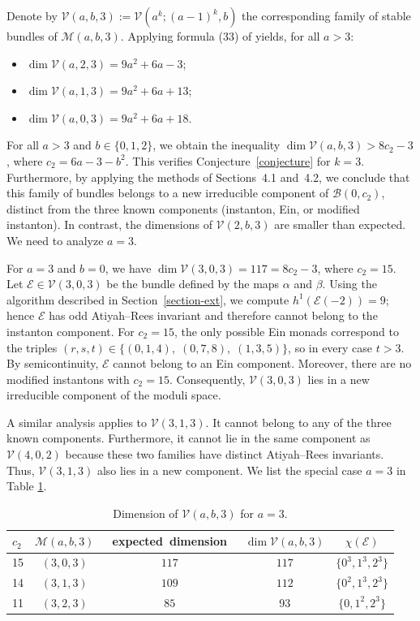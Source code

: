 \documentclass[twoside,reqno]{amsart}
\theoremstyle{plain}
\newcommand{\E}{\mathcal{E}}
\newcommand{\cM}{\mathcal{M}}
\begin{document}
Denote by $\mathcal{V}(a,b,3):=\mathcal{V}({a}^k;({a-1})^k,{b})$ the corresponding family of stable bundles of $\cM(a,b,3)$.
Applying formula (33) of \cite{MF2021} yields, for all $a>3$:
\begin{itemize}
     \item$\dim \mathcal{V}(a,2,3)=9a^{2}+6a-3$;
     \item$\dim \mathcal{V}(a,1,3)=9a^2+6a+13$; 
     \item$\dim \mathcal{V}(a,0,3)=9a^{2}+6a+18$.
\end{itemize}
 For all \(a>3\) and \(b\in\{0,1,2\}\), we obtain the inequality  $\dim\mathcal{V}(a,b,3) > 8c_2-3$,
where \(c_2 = 6a - 3 - b^2\). This verifies Conjecture~\ref{conjecture} for \(k=3\). Furthermore, by applying the 
methods of Sections~4.1 and~4.2, we conclude that this family of bundles belongs to a new irreducible 
component of \(\mathcal{B}(0,c_2)\), distinct from the three known components (instanton, Ein, or modified instanton). In contrast, the dimensions of $\mathcal{V}(2,b,3)$ are smaller than expected. We need to analyze $a=3$.
 
 For $a=3$ and $b=0$, we have $\dim\mathcal{V}(3,0,3)=117=8c_2-3$, where $c_2=15$.
Let $\E\in\mathcal{V}(3,0,3)$ be the bundle defined by the maps $\alpha$ and $\beta$.
Using the algorithm described in Section~\ref{section-ext}, we compute $h^{1}(\E(-2))=9$; hence $\E$ has odd Atiyah--Rees invariant and therefore cannot belong to the instanton component. For $c_2=15$, the only possible Ein monads correspond to the triples $(r,s,t)\in\{(0,1,4),\;(0,7,8),\;(1,3,5)\}$,
so in every case $t>3$. By semicontinuity, $\E$ cannot belong to an Ein component. Moreover, there are no modified instantons with $c_2=15$. Consequently, $\mathcal{V}(3,0,3)$ lies in a new irreducible component of the moduli space. 

A similar analysis applies to $\mathcal{V}(3,1,3)$. It cannot belong to any of the three known components. 
Furthermore, it cannot lie in the same component as $\mathcal{V}(4,0,2)$ because these two families have distinct Atiyah--Rees invariants. Thus, $\mathcal{V}(3,1,3)$ also lies in a new component.  We list the special case $a=3$ in Table \ref{table:2}.
    \begin{table}[h]
 \centering
\begin{tabular}{|l|c|c|c|c|}
\hline
$c_2$ & $\cM(a,b,3)$ &  \mbox{ expected dimension } & $\dim \mathcal{V}(a,b,3)$ & $\chi(\E)$\\ \hline
         15    & $(3,0,3)$     &  $117$    &      $117$&$\{0^3,1^3,2^3\}$  \\ \hline
    14   &$(3,1,3)$ &       $109$     &   $112$  &$\{0^2,1^3,2^3\}$\\ \hline
      11   & $(3,2,3)$    &   $85$         &      93   & $\{0,1^2,2^3\}$ \\ \hline
\end{tabular}
\caption{Dimension of $\mathcal{V}(a,b,3)$ for $a=3$.}
\label{table:2}
\end{table}
\end{document}
